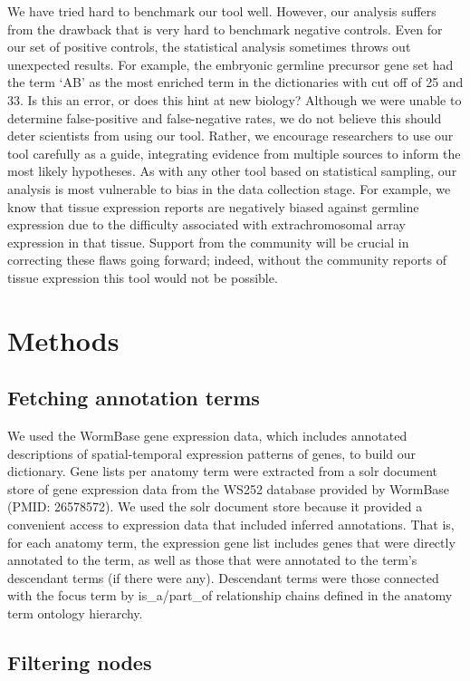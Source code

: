 \documentclass{bmcart}
\begin{document}
We have tried hard to benchmark our tool well. However, our analysis suffers from the drawback that is very hard to benchmark negative controls. Even for our set of positive controls, the statistical analysis sometimes throws out unexpected results. For example, the embryonic germline precursor gene set had the term `AB' as the most enriched term in the dictionaries with cut off of 25 and 33. Is this an error, or does this hint at new biology? Although we were unable to determine false-positive and false-negative rates, we  do not believe this should deter scientists from using our tool. Rather, we encourage researchers to use our tool carefully as a guide, integrating evidence from multiple sources to inform the most likely hypotheses. As with any other tool based on statistical sampling, our analysis is most vulnerable to bias in the data collection stage. For example, we know that tissue expression reports are negatively biased against germline expression due to the difficulty associated with extrachromosomal array expression in that tissue. Support from the community will be crucial in correcting these flaws going forward; indeed, without the community reports of tissue expression this tool would not be possible.

\section*{Methods}
\subsection*{Fetching annotation terms}
We used the WormBase gene expression data, which includes annotated descriptions of spatial-temporal expression patterns of genes, to build our dictionary. Gene lists per anatomy term were extracted from a solr document store of gene expression data from the WS252 database provided by WormBase (PMID: 26578572). We used the solr document store because it provided a convenient access to expression data that included inferred annotations. That is, for each anatomy term, the expression gene list includes genes that were directly annotated to the term, as well as those that were annotated to the term's descendant terms (if there were any). Descendant terms were those connected with the focus term by is\_a/part\_of relationship chains defined in the anatomy term ontology hierarchy.
\subsection*{Filtering nodes}
\end{document}
